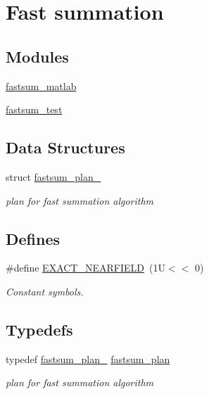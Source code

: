 \hypertarget{group__applications__fastsum}{
\section{Fast summation}
\label{group__applications__fastsum}
}
\subsection*{Modules}
\begin{CompactItemize}
\item 
\hyperlink{group__applications__fastsum__matlab}{fastsum\_\-matlab}
\item 
\hyperlink{group__applications__fastsum__test}{fastsum\_\-test}
\end{CompactItemize}
\subsection*{Data Structures}
\begin{CompactItemize}
\item 
struct \hyperlink{structfastsum__plan__}{fastsum\_\-plan\_\-}
\begin{CompactList}\small\item\em plan for fast summation algorithm \item\end{CompactList}\end{CompactItemize}
\subsection*{Defines}
\begin{CompactItemize}
\item 
\hypertarget{group__applications__fastsum_ga31}{
\#define \hyperlink{group__applications__fastsum_ga31}{EXACT\_\-NEARFIELD}~(1U$<$$<$ 0)}
\label{group__applications__fastsum_ga31}

\begin{CompactList}\small\item\em Constant symbols. \item\end{CompactList}\end{CompactItemize}
\subsection*{Typedefs}
\begin{CompactItemize}
\item 
\hypertarget{group__applications__fastsum_ga0}{
typedef \hyperlink{structfastsum__plan__}{fastsum\_\-plan\_\-} \hyperlink{group__applications__fastsum_ga0}{fastsum\_\-plan}}
\label{group__applications__fastsum_ga0}

\begin{CompactList}\small\item\em plan for fast summation algorithm \item\end{CompactList}\end{CompactItemize}
